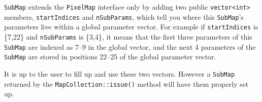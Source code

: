 \documentclass[11pt,preprint,flushrt]{aastex}
\begin{document}
{\tt SubMap} extends the {\tt PixelMap} interface only by adding two public {\tt vector<int>} members, {\tt startIndices} and {\tt nSubParams}, which tell you where this {\tt SubMap}'s parameters live within a global parameter vector.  For example if {\tt startIndices} is \{7,22\} and {\tt nSubParams} is \{3,4\}, it means that the first three parameters of this {\tt SubMap} are indexed as 7--9 in the global vector, and the next 4 parameters of the {\tt SubMap} are stored in positions 22--25 of the global parameter vector.

It is up to the user to fill up and use these two vectors.  However a {\tt SubMap} returned by the {\tt MapCollection::issue()} method will have them properly set up.
\end{document}
